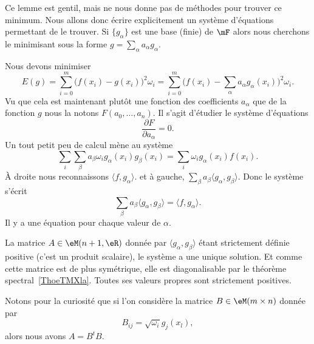 \begin{normaltext}
	Ce lemme est gentil, mais ne nous donne pas de méthodes pour trouver ce minimum. Nous allons donc écrire explicitement un système d'équations permettant de le trouver. Si \( \{ g_{\alpha} \} \) est une base (finie) de \( \mF\) alors nous cherchons le minimisant sous la forme \( g=\sum_{\alpha}a_{\alpha}g_{\alpha}\).

	Nous devons minimiser
	\begin{equation}
		E(g)=\sum_{i=0}^m\big( f(x_i)-g(x_i) \big)^2\omega_i=\sum_{i=0}^m\big( f(x_i)-\sum_{\alpha}a_{\alpha}g_{\alpha}(x_i) \big)^2\omega_i.
	\end{equation}
	Vu que cela est maintenant plutôt une fonction des coefficients \( a_{\alpha}\) que de la fonction \( g\) nous la notons \( F(a_0,\ldots, a_n)\). Il s'agit d'étudier le système d'équations
	\begin{equation}
		\frac{ \partial F }{ \partial a_{\alpha} }=0.
	\end{equation}
	Un tout petit peu de calcul mène au système
	\begin{equation}
		\sum_i\sum_{\beta}a_{\beta}\omega_ig_{\alpha}(x_i)g_{\beta}(x_i)=\sum_{i}\omega_ig_{\alpha}(x_i)f(x_i).
	\end{equation}
	À droite nous reconnaissons \( \langle f, g_{\alpha}\rangle \). et à gauche, \( \sum_{\beta}a_{\beta}\langle g_{\alpha}, g_{\beta}\rangle \). Donc le système s'écrit
	\begin{equation}
		\sum_{\beta}a_{\beta}\langle g_{\alpha}, g_{\beta}\rangle =\langle f, g_{\alpha}\rangle .
	\end{equation}
	Il y a une équation pour chaque valeur de \( \alpha\).

	La matrice \( A\in\eM(n+1,\eR)\) donnée par  \( \langle g_{\alpha}, g_{\beta}\rangle \) étant strictement définie positive (c'est un produit scalaire), le système a une unique solution. Et comme cette matrice est de plus symétrique, elle est diagonalisable par le théorème spectral~\ref{ThoeTMXla}. Toutes ses valeurs propres sont strictement positives.

	Notons pour la curiosité que si l'on considère la matrice \( B\in\eM(m\times n)\) donnée par
	\begin{equation}
		B_{ij}=\sqrt{ \omega_i }g_j(x_l),
	\end{equation}
	alors nous avons \( A=B^tB\).
\end{normaltext}


